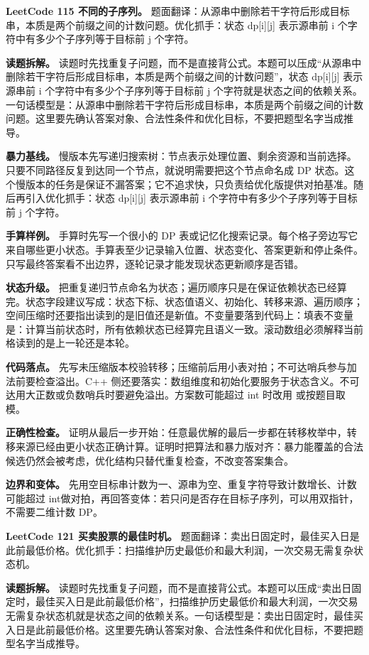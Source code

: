 \noindent\textbf{LeetCode 115 不同的子序列。} 题面翻译：从源串中删除若干字符后形成目标串，本质是两个前缀之间的计数问题。优化抓手：状态 dp[i][j] 表示源串前 i 个字符中有多少个子序列等于目标前 j 个字符。

\textbf{读题拆解。} 读题时先找重复子问题，而不是直接背公式。本题可以压成“从源串中删除若干字符后形成目标串，本质是两个前缀之间的计数问题”，状态 dp[i][j] 表示源串前 i 个字符中有多少个子序列等于目标前 j 个字符就是状态之间的依赖关系。一句话模型是：从源串中删除若干字符后形成目标串，本质是两个前缀之间的计数问题。这里要先确认答案对象、合法性条件和优化目标，不要把题型名字当成推导。

\textbf{暴力基线。} 慢版本先写递归搜索树：节点表示处理位置、剩余资源和当前选择。只要不同路径反复到达同一个节点，就说明需要把这个节点命名成 DP 状态。这个慢版本的任务是保证不漏答案；它不追求快，只负责给优化版提供对拍基准。随后再引入优化抓手：状态 dp[i][j] 表示源串前 i 个字符中有多少个子序列等于目标前 j 个字符。

\textbf{手算样例。} 手算时先写一个很小的 DP 表或记忆化搜索记录。每个格子旁边写它来自哪些更小状态。手算表至少记录输入位置、状态变化、答案更新和停止条件。只写最终答案看不出边界，逐轮记录才能发现状态更新顺序是否错。

\textbf{状态升级。} 把重复递归节点命名为状态；遍历顺序只是在保证依赖状态已经算完。状态字段建议写成：状态下标、状态值语义、初始化、转移来源、遍历顺序；空间压缩时还要指出读到的是旧值还是新值。不变量要落到代码上：填表不变量是：计算当前状态时，所有依赖状态已经算完且语义一致。滚动数组必须解释当前格读到的是上一轮还是本轮。

\textbf{代码落点。} 先写未压缩版本校验转移；压缩前后用小表对拍；不可达哨兵参与加法前要检查溢出。C++ 侧还要落实：数组维度和初始化要服务于状态含义。不可达用大正数或负数哨兵时要避免溢出。方案数可能超过 int 时改用  或按题目取模。

\textbf{正确性检查。} 证明从最后一步开始：任意最优解的最后一步都在转移枚举中，转移来源已经由更小状态正确计算。证明时把算法和暴力版对齐：暴力能覆盖的合法候选仍然会被考虑，优化结构只替代重复检查，不改变答案集合。

\textbf{边界和变体。} 先用空目标串计数为一、源串为空、重复字符导致计数增长、计数可能超过 int做对拍，再回答变体：若只问是否存在目标子序列，可以用双指针，不需要二维计数 DP。

\noindent\textbf{LeetCode 121 买卖股票的最佳时机。} 题面翻译：卖出日固定时，最佳买入日是此前最低价格。优化抓手：扫描维护历史最低价和最大利润，一次交易无需复杂状态机。

\textbf{读题拆解。} 读题时先找重复子问题，而不是直接背公式。本题可以压成“卖出日固定时，最佳买入日是此前最低价格”，扫描维护历史最低价和最大利润，一次交易无需复杂状态机就是状态之间的依赖关系。一句话模型是：卖出日固定时，最佳买入日是此前最低价格。这里要先确认答案对象、合法性条件和优化目标，不要把题型名字当成推导。

